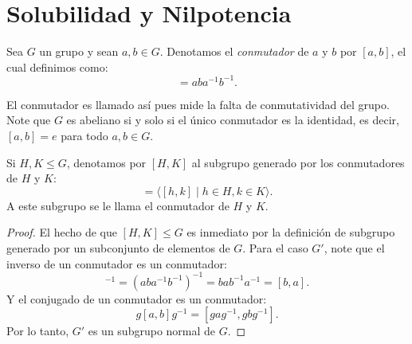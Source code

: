 \section{Solubilidad y Nilpotencia}
\label{sec:solubilidad_nilpotencia}


\begin{defi}[Conmutador]
    Sea $G$ un grupo y sean $a, b \in G$. Denotamos el \emph{conmutador} de $a$ y $b$ por $[a, b]$, el cual definimos como:
    \begin{equation*}
        [a, b] = aba^{-1}b^{-1}.
    \end{equation*}
\end{defi}

\begin{nota}
    El conmutador es llamado así pues mide la falta de conmutatividad del grupo. Note que $G$ es abeliano si y solo si el único conmutador es la identidad, es decir, $[a, b] = e$ para todo $a, b \in G$.
\end{nota}

\begin{defi}
    Si $H, K \le G$, denotamos por $[H, K]$ al subgrupo generado por los conmutadores de $H$ y $K$:
    \begin{equation*}
        [H, K] = \langle [h, k] \mid h \in H, k \in K \rangle.
    \end{equation*}
    A este subgrupo se le llama el conmutador de $H$ y $K$.
\end{defi}


\begin{proof}
    El hecho de que $[H,K] \le G$ es inmediato por la definición de subgrupo generado por un subconjunto de elementos de $G$. Para el caso $G'$, note que el inverso de un conmutador es un conmutador:
    \begin{equation*}
        [a,b]^{-1} = (aba^{-1}b^{-1})^{-1} = bab^{-1}a^{-1} = [b,a].
    \end{equation*}
    Y el conjugado de un conmutador es un conmutador:
    \begin{equation*}
        g[a,b]g^{-1} = [gag^{-1}, gbg^{-1}].
    \end{equation*}
    Por lo tanto, $G'$ es un subgrupo normal de $G$.
\end{proof}

